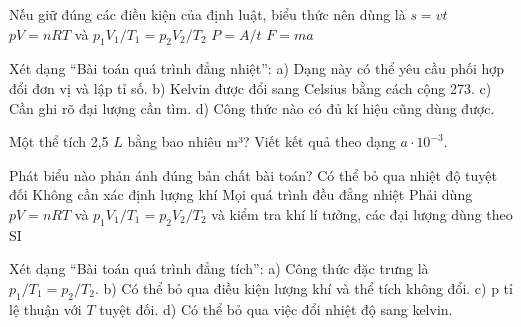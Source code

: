 \begin{ex}
Nếu giữ đúng các điều kiện của định luật, biểu thức nên dùng là
\choice
{$s=vt$}
{\True $pV=nRT$ và $p_1V_1/T_1=p_2V_2/T_2$}
{$P=A/t$}
{$F=ma$}
\end{ex}

\begin{ex}
Xét dạng “Bài toán quá trình đẳng nhiệt”: a) Dạng này có thể yêu cầu phối hợp đổi đơn vị và lập tỉ số. b) Kelvin được đổi sang Celsius bằng cách cộng 273. c) Cần ghi rõ đại lượng cần tìm. d) Công thức nào có đủ kí hiệu cũng dùng được.
\choiceTF

\end{ex}

\begin{ex}
Một thể tích 2,5 $L$ bằng bao nhiêu m³? Viết kết quả theo dạng $a\cdot10^{-3}$.
\end{ex}

\begin{ex}
Phát biểu nào phản ánh đúng bản chất bài toán?
\choice
{Có thể bỏ qua nhiệt độ tuyệt đối}
{Không cần xác định lượng khí}
{Mọi quá trình đều đẳng nhiệt}
{\True Phải dùng $pV=nRT$ và $p_1V_1/T_1=p_2V_2/T_2$ và kiểm tra khí lí tưởng, các đại lượng dùng theo SI}
\end{ex}

\begin{ex}
Xét dạng “Bài toán quá trình đẳng tích”: a) Công thức đặc trưng là $p_1/T_1=p_2/T_2$. b) Có thể bỏ qua điều kiện lượng khí và thể tích không đổi. c) p tỉ lệ thuận với $T$ tuyệt đối. d) Có thể bỏ qua việc đổi nhiệt độ sang kelvin.
\choiceTF

\end{ex}

